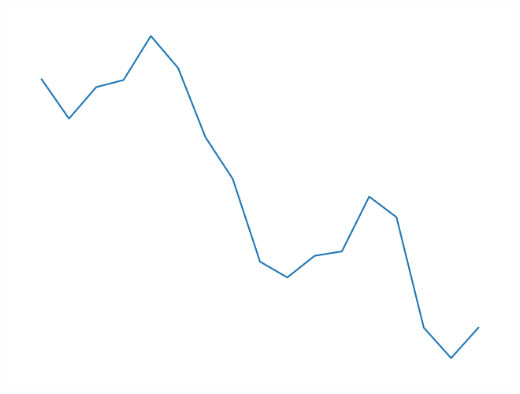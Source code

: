 \documentclass[11pt,class=report,crop=false]{standalone}
\begin{document}
\begin{exemple}
\begin{center}
\includegraphics[scale=\myscale,scale=0.2]{figures/landscape-03-4}


\end{center}
\end{exemple}
\end{document}
